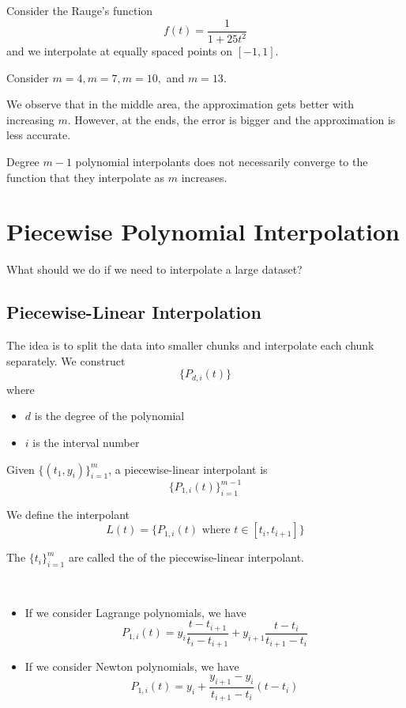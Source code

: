 \begin{example}
    Consider the Rauge's function \[
        f(t) = \frac{1}{1 + 25t^2}
    \] and we interpolate at equally spaced points on \( [-1, 1] \).

    Consider \( m = 4, m = 7, m = 10, \) and \( m = 13 \).


    We observe that in the middle area, the approximation gets better with increasing \( m \). However, at the ends, the error is bigger and the approximation is less accurate.
\end{example}

\begin{remark}
    Degree \( m - 1 \) polynomial interpolants does not necessarily converge to the function that they interpolate as \( m \) increases.
\end{remark}

\section{Piecewise Polynomial Interpolation}

What should we do if we need to interpolate a large dataset?

\subsection{Piecewise-Linear Interpolation}

The idea is to split the data into smaller chunks and interpolate each chunk separately. We construct  \[
    \{ P_{d,i}(t) \}
\] where
\begin{itemize}
    \item \( d \) is the degree of the polynomial
    \item \( i \) is the interval number
\end{itemize}

\begin{example}
    Given \( \{ (t_1, y_i ) \}_{i=1}^{m} \), a piecewise-linear interpolant is \[
        \{ P_{1,i}(t) \}_{i=1}^{m-1}
    \]

    We define the interpolant \[
        L(t) = \{ P_{1,i}(t) \text{ where } t \in [t_i, t_{i+1}] \}
    \]

    The \( \{ t_i \}_{i=1}^{m} \) are called the  of the piecewise-linear interpolant.

        {~~~}

    \begin{itemize}
        \item If we consider Lagrange polynomials, we have \[
                  P_{1,i}(t) = y_i \frac{t-t_{i+1}}{t_i - t_{i+1}} + y_{i+1} \frac{t-t_i}{t_{i+1} - t_i}
              \]

        \item If we consider Newton polynomials, we have \[
                  P_{1,i}(t) = y_i + \frac{y_{i+1} - y_i}{t_{i+1} - t_i} (t - t_i)
              \]
    \end{itemize}
\end{example}

